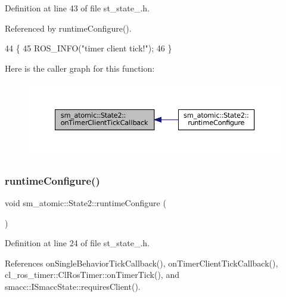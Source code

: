 Definition at line 43 of file st\+\_\+state\+\_.\+h.



Referenced by runtime\+Configure().


\begin{DoxyCode}
44     \{
45         ROS\_INFO(\textcolor{stringliteral}{"timer client tick!"});
46     \}
\end{DoxyCode}
Here is the caller graph for this function\+:
\nopagebreak
\begin{figure}[H]
\begin{center}
\leavevmode
\includegraphics[width=350pt]{structsm__atomic_1_1State2_ab265295bfddde63b2dcf5f97bfc44e48_icgraph}
\end{center}
\end{figure}
\mbox{\label{structsm__atomic_1_1State2_afd749890e13d8aa36f1ac6645a5f7f9a}} 
\subsubsection{\texorpdfstring{runtime\+Configure()}{runtimeConfigure()}}
{\footnotesize\ttfamily void sm\+\_\+atomic\+::\+State2\+::runtime\+Configure (\begin{DoxyParamCaption}{ }\end{DoxyParamCaption})\hspace{0.3cm}{\ttfamily [inline]}}



Definition at line 24 of file st\+\_\+state\+\_.\+h.



References on\+Single\+Behavior\+Tick\+Callback(), on\+Timer\+Client\+Tick\+Callback(), cl\+\_\+ros\+\_\+timer\+::\+Cl\+Ros\+Timer\+::on\+Timer\+Tick(), and smacc\+::\+I\+Smacc\+State\+::requires\+Client().


